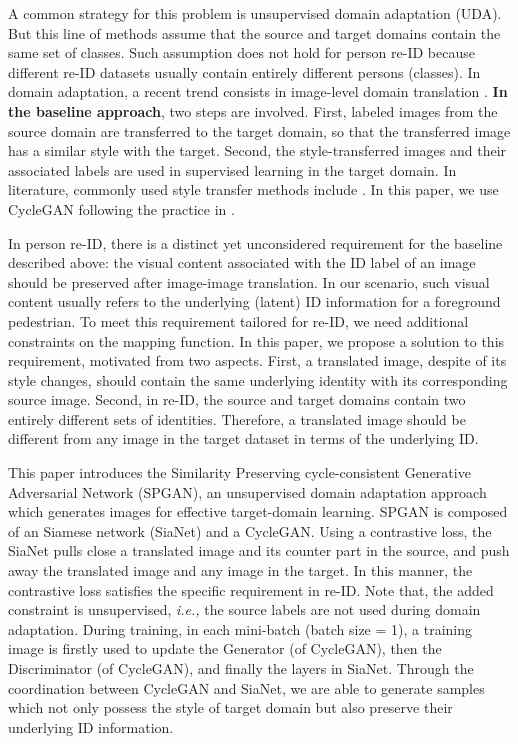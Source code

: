 \documentclass[10pt,twocolumn,letterpaper]{article}
\begin{document}
A common strategy for this problem is unsupervised domain adaptation (UDA). But this line of methods assume that the source and target domains contain the same set of classes. Such assumption does not hold for person re-ID because different re-ID datasets usually contain entirely different persons (classes). 
In domain adaptation, a recent trend consists in image-level domain translation \cite{ cycledomain, DBLP:journals/corr/BousmalisSDEK16, DBLP:conf/nips/LiuT16}. \textbf{In the baseline approach}, two steps are involved. First, labeled images from the source domain are transferred to the target domain, so that the transferred image has a similar style with the target. Second, the style-transferred images and their associated labels are used in supervised learning in the target domain. In literature, commonly used style transfer methods include \cite{DBLP:journals/corr/LiuBK17,DiscoGAN, DualGAN, cycle}. In this paper, we use CycleGAN \cite{cycle} following the practice in \cite{DBLP:journals/corr/LiuBK17, cycledomain}.

In person re-ID, there is a distinct yet unconsidered requirement for the baseline described above: the visual content associated with the ID label of an image should be preserved after image-image translation. In our scenario, such visual content usually refers to the underlying (latent) ID information for a foreground pedestrian. To meet this requirement tailored for re-ID, we need additional constraints on the mapping function. 
In this paper, we propose a solution to this requirement, motivated from two aspects. First, a translated image, despite of its style changes, should contain the same underlying identity with its corresponding source image. Second, in re-ID, the source and target domains contain two entirely different sets of identities. Therefore, a translated image should be different from any image in the target dataset in terms of the underlying ID. 

This paper introduces the Similarity Preserving cycle-consistent Generative Adversarial Network (SPGAN), an unsupervised domain adaptation approach which generates images for effective target-domain learning. SPGAN is composed of an Siamese network (SiaNet) and a CycleGAN. Using a contrastive loss, the SiaNet pulls close a translated image and its counter part in the source, and push away the translated image and any image in the target. In this manner, the contrastive loss satisfies the specific requirement in re-ID. Note that, the added constraint is unsupervised, \emph{i.e.,} the source labels are not used during domain adaptation.
During training, in each mini-batch (batch size = 1), a training image is firstly used to update the Generator (of CycleGAN), then the Discriminator (of CycleGAN), and finally the layers in SiaNet. Through the coordination between CycleGAN and SiaNet, we are able to generate samples which not only possess the style of target domain but also preserve their underlying ID information. 
\end{document}
